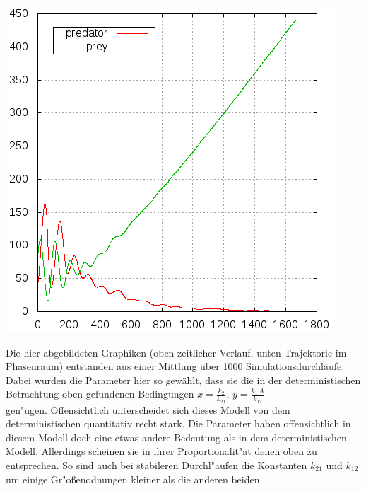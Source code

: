 \documentclass[11pt]{article}
\begin{document}
\begin{minipage}[b]{0.58\textwidth}
\includegraphics[width=\textwidth]{Graphiken/ppm42pop.png}
\end{minipage}
\hfil
\begin{minipage}[b]{0.39\textwidth}
Die hier abgebildeten Graphiken (oben zeitlicher Verlauf, unten Trajektorie im Phasenraum) entstanden aus einer Mittlung über 1000 Simulationsdurchläufe. Dabei wurden die Parameter hier so gewählt, dass sie die in der deterministischen Betrachtung oben gefundenen Bedingungen
$x=\frac{k_2}{k_{21}}$, $y=\frac{k_1\,A}{k_{12}}$\\
gen"ugen. Offensichtlich unterscheidet sich dieses Modell von dem deterministischen quantitativ recht stark. Die Parameter haben offensichtlich in diesem Modell doch eine etwas andere Bedeutung als in dem deterministischen Modell. Allerdings scheinen sie in ihrer Proportionalit"at denen oben zu entsprechen. So sind auch bei stabileren Durchl"aufen die Konstanten $k_{21}$ und $k_{12}$ um einige Gr"oßenodnungen kleiner als die anderen beiden. 
\end{minipage}
\end{document}

